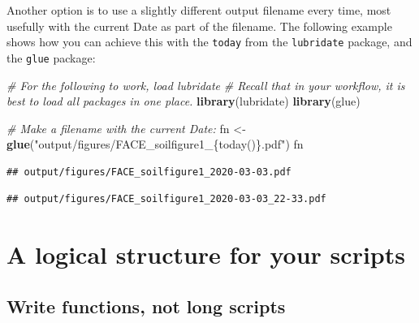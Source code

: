 \documentclass[]{book}
\newenvironment{Shaded}{\begin{snugshade}}{\end{snugshade}}
\newcommand{\CommentTok}[1]{\textcolor[rgb]{0.56,0.35,0.01}{\textit{#1}}}
\newcommand{\KeywordTok}[1]{\textcolor[rgb]{0.13,0.29,0.53}{\textbf{#1}}}
\newcommand{\NormalTok}[1]{#1}
\newcommand{\StringTok}[1]{\textcolor[rgb]{0.31,0.60,0.02}{#1}}
\begin{document}
Another option is to use a slightly different output filename every time, most usefully with the current Date as part of the filename. The following example shows how you can achieve this with the \texttt{today} from the \texttt{lubridate} package, and the \texttt{glue} package:

\begin{Shaded}
\begin{Highlighting}[]
\CommentTok{# For the following to work, load lubridate}
\CommentTok{# Recall that in your workflow, it is best to load all packages in one place.}
\KeywordTok{library}\NormalTok{(lubridate)}
\KeywordTok{library}\NormalTok{(glue)}

\CommentTok{# Make a filename with the current Date:}
\NormalTok{fn <-}\StringTok{ }\KeywordTok{glue}\NormalTok{(}\StringTok{"output/figures/FACE_soilfigure1_\{today()\}.pdf"}\NormalTok{)}
\NormalTok{fn}
\end{Highlighting}
\end{Shaded}

\begin{verbatim}
## output/figures/FACE_soilfigure1_2020-03-03.pdf
\end{verbatim}

\begin{Shaded}
\end{Shaded}

\begin{verbatim}
## output/figures/FACE_soilfigure1_2020-03-03_22-33.pdf
\end{verbatim}

\hypertarget{scriptstructure}{%
\section{A logical structure for your scripts}\label{scriptstructure}}

\hypertarget{write-functions-not-long-scripts}{%
\subsection{Write functions, not long scripts}\label{write-functions-not-long-scripts}}
\end{document}
